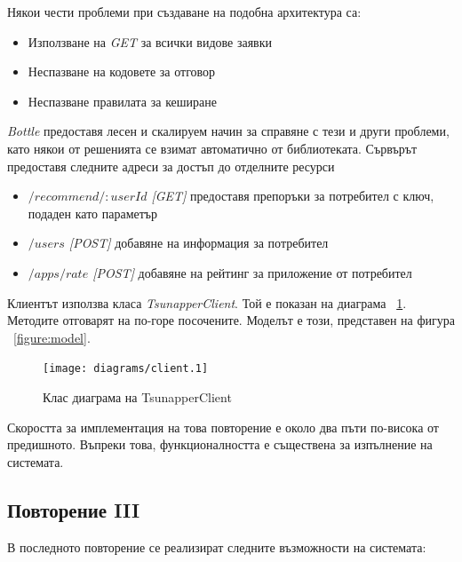 		Някои чести проблеми при създаване на подобна архитектура са:\cite{Vitvar}
		
		\begin{itemize}
			\item Използване на \emph{GET} за всички видове заявки
			\item Неспазване на кодовете за отговор
			\item Неспазване правилата за кеширане
		\end{itemize}
		
		\emph{Bottle} предоставя лесен и скалируем начин за справяне с тези и други проблеми, като някои от решенията се взимат автоматично от библиотеката. Сървърът предоставя следните адреси за достъп до отделните ресурси
		
		\begin{itemize}
			\item \emph{$/recommend/:userId$ [GET]} предоставя препоръки за потребител с ключ, подаден като параметър
			\item \emph{$/users$ [POST]} добавяне на информация за потребител
			\item \emph{$/apps/rate$ [POST]} добавяне на рейтинг за приложение от потребител
		\end{itemize}
		
		Клиентът използва класа \emph{TsunapperClient}. Той е показан на диаграма ~\ref{figure:client}. Методите отговарят на по-горе посочените. Моделът е този, представен на фигура ~\ref{figure:model}.
		
		\vspace{2em}		
		
		\begin{figure}[htbp]
			\centering
 			\texttt{[image: diagrams/client.1]}
			\caption{Клас диаграма на TsunapperClient}
			\label{figure:client}
		\end{figure}
		
		\vspace{2em}		
		
		Скоростта за имплементация на това повторение е около два пъти по-висока от предишното. Въпреки това, функционалността е съществена за изпълнение на системата.
		
	\subsection{Повторение III}
	
		В последното повторение се реализират следните възможности на системата:
		
